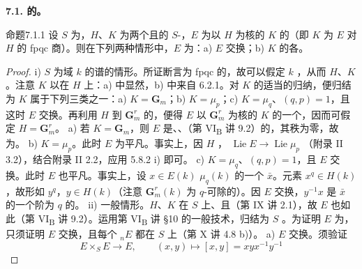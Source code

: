 \textbf{7.1. 的。}
\begin{SGAresult}{命题}{7.1.1}
设 $S$ 为，$H$、$K$ 为两个且的 $S$-，$E$ 为以 $H$ 为核的 $K$ 的（即 $K$ 为 $E$ 对 $H$ 的 fpqc 商）。则在下列两种情形中，$E$ 为：a) $E$ 交换；b) $K$ 的各。
\end{SGAresult}
\begin{proof}
i) $S$ 为域 $k$ 的谱的情形。所证断言为 fpqc 的，故可以假定 $k$ ，从而 $H$、$K$ 。注意 $K$ 以在 $H$ 上：a) 中显然，b) 中来自 6.2.1。对 $K$ 的适当的归纳，便归结为 $K$ 属于下列三类之一：a) $K=\mathbf G_m$；b) $K=\mu_p$；c) $K=\mu_q$、$(q,p)=1$，且这时 $E$ 交换。再利用 $H$ 到 $\mathbf G_m^r$ 的，便得 $E$ 以 $\mathbf G_m^r$ 为核的 $K$ 的一个，因而可假定 $H=\mathbf G_m^r$。
a) 若 $K=\mathbf G_m$，则 $E$ 是、、（第 VI\textsubscript{B} 讲 9.2）的，其秩为零，故为。
b) $K=\mu_p$。此时 $E$ 为平凡。事实上，因 $H$ ， $\operatorname{Lie}E\to\operatorname{Lie}\mu_p$ （附录 II 3.2），结合附录 II 2.2，应用 5.8.2 i) 即可。
c) $K=\mu_q$、$(q,p)=1$，且 $E$ 交换。此时 $E$ 也平凡。事实上，设 $x\in E(k)$  $\mu_q(k)$ 的一个 $\bar x$。元素 $x^q\in H(k)$，故形如 $y^q$，$y\in H(k)$（注意 $\mathbf G_m^r(k)$ 为 $q$-可除的）。因 $E$ 交换，$y^{-1}x$ 是 $\bar x$ 的一个阶为 $q$ 的。
ii) 一般情形。$H$、$K$ 在 $S$ 上、且（第 IX 讲 2.1），故 $E$ 也如此（第 VI\textsubscript{B} 讲 9.2）。运用第 VI\textsubscript{B} 讲 §10 的一般技术，归结为 $S$ 。为证明 $E$ 为，只须证明 $E$ 交换，且每个 ${}_nE$ 都在 $S$ 上（第 X 讲 4.8 b)）。
a) $E$ 交换。须验证
\[E\times_SE\longrightarrow E,\qquad(x,y)\longmapsto[x,y]=xyx^{-1}y^{-1}\]

\end{proof}
